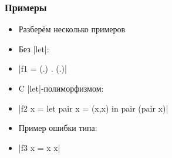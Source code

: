 \documentclass[11pt]{beamer}
\begin{document}
%

\begin{frame}[fragile]
  \frametitle{Примеры}
  \begin{itemize}
    \item Разберём несколько примеров
          \pause
    \item Без \haskinline|let|:
    \item[] \haskinline|f1 = (.) . (.)|
      \pause
    \item C \haskinline|let|-полиморфизмом:
    \item[] \haskinline|f2 x = let pair x = (x,x) in pair (pair x)|
      \pause
    \item Пример ошибки типа:
    \item[] \haskinline|f3 x = x x|
  \end{itemize}
\end{frame}
\end{document}
